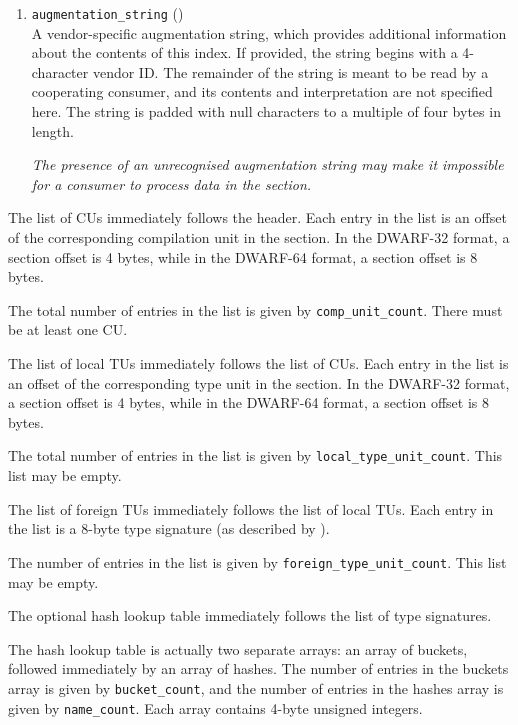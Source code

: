 \begin{enumerate}[1. ]
\item \texttt{augmentation\_string} (\HFTaugstring) \\
A vendor-specific augmentation string, which provides additional 
information about the contents of this index. If provided, the string
begins with a 4-character vendor ID. The remainder of the
string is meant to be read by a cooperating consumer, and its
contents and interpretation are not specified here. The
string is padded with null characters to a multiple of
four bytes in length.

\textit{The presence of an unrecognised augmentation string may make it impossible
for a consumer to process data in the \dotdebugnames{} section.}

\end{enumerate}

The list of CUs immediately follows the header. Each entry in the 
list is an offset of the corresponding compilation unit
in the \dotdebuginfo{} section.
In the DWARF-32 format, a section offset is 4 bytes, 
while in the DWARF-64 format, a section offset is 8 bytes.

The total number of entries in the list is given by \texttt{comp\_unit\_count}.
There must be at least one CU.

The list of local TUs immediately follows the list of CUs. Each 
entry in the list is an offset of the corresponding type unit
in the \dotdebuginfo{} section. 
In the DWARF-32 format, a section offset is 4 bytes, 
while in the DWARF-64 format, a section offset is 8 bytes.

The total number of entries in the list is given by
\texttt{local\_type\_unit\_count}. This list may be empty.

The list of foreign TUs immediately follows the list of local TUs.
Each entry in the list is a 8-byte type signature (as described by
\DWFORMrefsigeight).

The number of entries in the list is given by \texttt{foreign\_type\_unit\_count}.
This list may be empty.

The optional hash lookup table immediately follows the list of type signatures.

The hash lookup table is actually two separate arrays: an array of
buckets, followed immediately by an array of hashes. The number of
entries in the buckets array is given by \texttt{bucket\_count}, and the number
of entries in the hashes array is given by \texttt{name\_count}. Each array
contains 4-byte unsigned integers.

